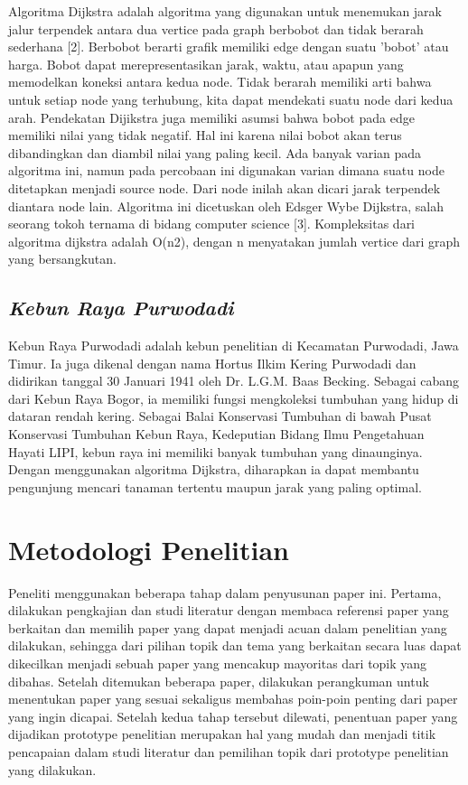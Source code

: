 \documentclass[conference]{IEEEtran}
\begin{document}
Algoritma Dijkstra adalah algoritma yang digunakan untuk
menemukan jarak jalur terpendek antara dua vertice pada
graph berbobot dan tidak berarah sederhana [2]. Berbobot
berarti grafik memiliki edge dengan suatu ’bobot’ atau harga.
Bobot dapat merepresentasikan jarak, waktu, atau apapun
yang memodelkan koneksi antara kedua node. Tidak berarah
memiliki arti bahwa untuk setiap node yang terhubung, kita
dapat mendekati suatu node dari kedua arah. Pendekatan Dijikstra
juga memiliki asumsi bahwa bobot pada edge memiliki
nilai yang tidak negatif. Hal ini karena nilai bobot akan
terus dibandingkan dan diambil nilai yang paling kecil. Ada
banyak varian pada algoritma ini, namun pada percobaan
ini digunakan varian dimana suatu node ditetapkan menjadi
source node. Dari node inilah akan dicari jarak terpendek
diantara node lain. Algoritma ini dicetuskan oleh Edsger
Wybe Dijkstra, salah seorang tokoh ternama di bidang computer
science [3]. Kompleksitas dari algoritma dijkstra adalah
O(n2), dengan n menyatakan jumlah vertice dari graph yang
bersangkutan.
\subsection{\textit{Kebun Raya Purwodadi}}
Kebun Raya Purwodadi adalah kebun penelitian di Kecamatan
Purwodadi, Jawa Timur. Ia juga dikenal dengan nama
Hortus Ilkim Kering Purwodadi dan didirikan tanggal 30 Januari
1941 oleh Dr. L.G.M. Baas Becking. Sebagai cabang dari
Kebun Raya Bogor, ia memiliki fungsi mengkoleksi tumbuhan
yang hidup di dataran rendah kering. Sebagai Balai Konservasi
Tumbuhan di bawah Pusat Konservasi Tumbuhan Kebun Raya,
Kedeputian Bidang Ilmu Pengetahuan Hayati LIPI, kebun raya
ini memiliki banyak tumbuhan yang dinaunginya. Dengan
menggunakan algoritma Dijkstra, diharapkan ia dapat membantu
pengunjung mencari tanaman tertentu maupun jarak
yang paling optimal.

\section{Metodologi Penelitian}
Peneliti menggunakan beberapa tahap dalam penyusunan
paper ini. Pertama, dilakukan pengkajian dan studi literatur
dengan membaca referensi paper yang berkaitan dan memilih
paper yang dapat menjadi acuan dalam penelitian yang dilakukan,
sehingga dari pilihan topik dan tema yang berkaitan
secara luas dapat dikecilkan menjadi sebuah paper yang mencakup
mayoritas dari topik yang dibahas. Setelah ditemukan
beberapa paper, dilakukan perangkuman untuk menentukan
paper yang sesuai sekaligus membahas poin-poin penting
dari paper yang ingin dicapai. Setelah kedua tahap tersebut
dilewati, penentuan paper yang dijadikan prototype penelitian
merupakan hal yang mudah dan menjadi titik pencapaian
dalam studi literatur dan pemilihan topik dari prototype penelitian
yang dilakukan.
\end{document}
